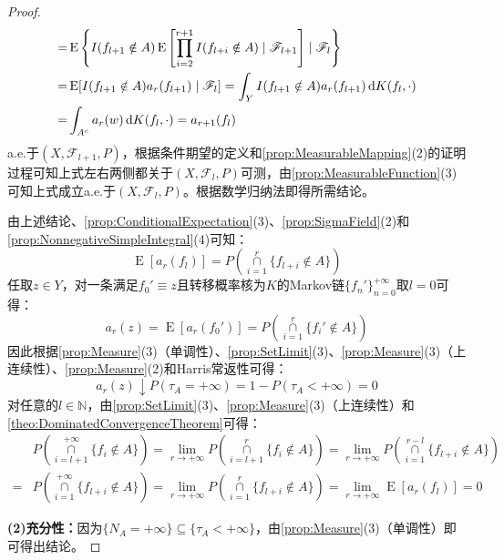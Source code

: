 \begin{proof}
\begin{align*}
		=&\operatorname{E}\left\{I(f_{l+1}\notin A)\operatorname{E}\left[\prod_{i=2}^{r+1}I(f_{l+i}\notin A)\mid\mathscr{F}_{l+1}\right]\mid\mathscr{F}_l\right\} \\
		=&\operatorname{E}[I(f_{l+1}\notin A)a_r(f_{l+1})\mid\mathscr{F}_l]=\int_{Y}I(f_{l+1}\notin A)a_r(f_{l+1})\mathop{}\!\mathrm{d} K(f_l,\cdot) \\
		=&\int_{A^c}a_r(w)\mathop{}\!\mathrm{d} K(f_l,\cdot)=a_{r+1}(f_l)
	\end{align*}
	a.e.于$(X,\mathscr{F}_{l+1},P)$，根据条件期望的定义和\cref{prop:MeasurableMapping}(2)的证明过程可知上式左右两侧都关于$(X,\mathscr{F}_l,P)$可测，由\cref{prop:MeasurableFunction}(3)可知上式成立a.e.于$(X,\mathscr{F}_l,P)$。根据数学归纳法即得所需结论。\par
	由上述结论、\cref{prop:ConditionalExpectation}(3)、\cref{prop:SigmaField}(2)和\cref{prop:NonnegativeSimpleIntegral}(4)可知：
	\begin{equation*}
		\operatorname{E}[a_r(f_l)]=P\left(\underset{i=1}{\overset{r}{\cap}}\{f_{l+i}\notin A\}\right)
	\end{equation*}
	任取$z\in Y$，对一条满足$f_0'\equiv z$且转移概率核为$K$的Markov链$\{f_n'\}_{n=0}^{+\infty}$取$l=0$可得：
	\begin{equation*}
		a_r(z)=\operatorname{E}[a_r(f_0')]=P\left(\underset{i=1}{\overset{r}{\cap}}\{f_i'\notin A\}\right)
	\end{equation*}
	因此根据\cref{prop:Measure}(3)（单调性）、\cref{prop:SetLimit}(3)、\cref{prop:Measure}(3)（上连续性）、\cref{prop:Measure}(2)和Harris常返性可得：
	\begin{equation*}
		a_r(z)\downarrow P(\tau_A=+\infty)=1-P(\tau_A<+\infty)=0
	\end{equation*}
	对任意的$l\in\mathbb{N}$，由\cref{prop:SetLimit}(3)、\cref{prop:Measure}(3)（上连续性）和\cref{theo:DominatedConvergenceTheorem}可得：
	\begin{align*}
		&P\left(\underset{i=l+1}{\overset{+\infty}{\cap}}\{f_i\notin A\}\right)=\lim_{r\to+\infty}P\left(\underset{i=l+1}{\overset{r}{\cap}}\{f_i\notin A\}\right)=\lim_{r\to+\infty}P\left(\underset{i=1}{\overset{r-l}{\cap}}\{f_{l+i}\notin A\}\right) \\
		=&P\left(\underset{i=1}{\overset{+\infty}{\cap}}\{f_{l+i}\notin A\}\right)=\lim_{r\to+\infty}P\left(\underset{i=1}{\overset{r}{\cap}}\{f_{l+i}\notin A\}\right)=\lim_{r\to+\infty}\operatorname{E}[a_r(f_l)]=0
	\end{align*}\par
	\textbf{(2)充分性：}因为$\{N_A=+\infty\}\subseteq\{\tau_A<+\infty\}$，由\cref{prop:Measure}(3)（单调性）即可得出结论。\par

\end{proof}

